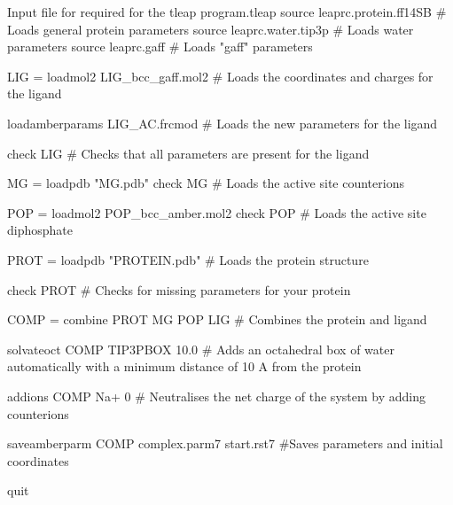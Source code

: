         \begin{inpfile}[label=file:tleap]{Input file for required for the tleap program.}{tleap}
source leaprc.protein.ff14SB        # Loads general protein parameters
source leaprc.water.tip3p           # Loads water parameters
source leaprc.gaff                  # Loads "gaff" parameters

LIG = loadmol2 LIG_bcc_gaff.mol2    
# Loads the coordinates and charges for the ligand

loadamberparams LIG_AC.frcmod       
# Loads the new parameters for the ligand

check LIG                           
# Checks that all parameters are present for the ligand

MG = loadpdb "MG.pdb"
check MG
# Loads the active site counterions

POP = loadmol2 POP_bcc_amber.mol2
check POP
# Loads the active site diphosphate

PROT = loadpdb "PROTEIN.pdb"        
# Loads the protein structure

check PROT                          
# Checks for missing parameters for your protein

COMP = combine {PROT MG POP LIG}           
# Combines the protein and ligand

solvateoct COMP TIP3PBOX 10.0        
# Adds an octahedral box of water automatically with a minimum distance of 10 A from the protein

addions COMP Na+ 0                  
# Neutralises the net charge of the system by adding counterions

saveamberparm COMP complex.parm7 start.rst7 
#Saves parameters and initial coordinates

quit
        \end{inpfile}